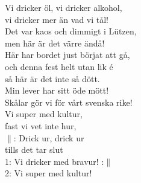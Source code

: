 \documentclass[a6paper, 10pt, twoside]{article}
\begin{document}
\begin{lyrics}
Vi dricker öl, vi dricker alkohol,\\
vi dricker mer än vad vi tål!\\
Det var kaos och dimmigt i Lützen,\\
men här är det värre ändå!\\
Här har bordet just börjat att gå,\\
och denna fest helt utan lik é\\
så här är det inte så dött.\\
Min lever har sitt öde mött!\\
Skålar gör vi för vårt svenska rike!\\
Vi super med kultur,\\
fast vi vet inte hur,\\
\newline
$\|$: Drick ur, drick ur\\
tills det tar slut\\
1: Vi dricker med bravur! :$\|$\\
2: Vi super med kultur!
\end{lyrics}
\end{document}
